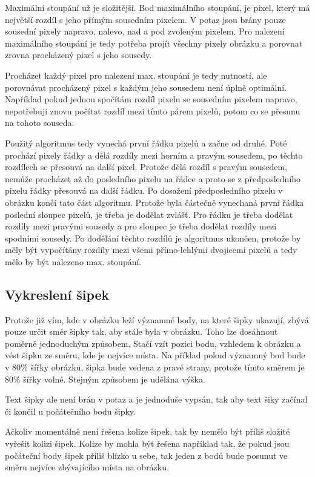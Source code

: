 \documentclass[12pt]{report}
\begin{document}
Maximální stoupání už je složitější. Bod maximálního stoupání, je pixel, který má největší rozdíl
s jeho přímým sousedním pixelem. V potaz jsou brány pouze sousední pixely napravo, nalevo, nad a pod
zvoleným pixelem. Pro nalezení maximálního stoupání je tedy potřeba projít všechny pixely obrázku 
a porovnat zrovna procházený pixel s jeho sousedy.

Procházet každý pixel pro nalezení max. stoupání je tedy nutností, ale porovnávat procházený pixel
s každým jeho sousedem není úplně optimální. Například pokud jednou spočítám rozdíl pixelu se 
sousedním pixelem napravo, nepotřebuji znovu počítat rozdíl mezi tímto párem pixelů, potom co se přesunu 
na tohoto souseda. 

Použitý algoritmus tedy vynechá první řádku pixelů a začne od druhé. Poté prochází pixely řádky a dělá
rozdíly mezi horním a pravým sousedem, po těchto rozdílech se přesouvá na další pixel. Protože dělá
rozdíl s pravým sousedem, nemůže procházet až do posledního pixelu na řádce a proto se z předposledního
pixelu řádky přesouvá na další řádku. Po dosažení předposledního pixelu v obrázku končí tato část algoritmu.
Protože byla částečně vynechaná první řádka poslední sloupec pixelů, je třeba je dodělat zvlášť. Pro
řádku je třeba dodělat rozdíly mezi pravými sousedy a pro sloupec je třeba dodělat rozdíly mezi spodními
sousedy. Po dodělání těchto rozdílů je algoritmus ukončen, protože by měly být vypočítány rozdíly mezi
všemi přímo-lehlými dvojicemi pixelů a tedy mělo by být nalezeno max. stoupání.
\subsection{Vykreslení šipek}
Protože již vím, kde v obrázku leží významné body, na které šipky ukazují, zbývá pouze určit směr šipky tak,
aby stále byla v obrázku. Toho lze dosáhnout poměrně jednoduchým způsobem. Stačí vzít pozici bodu, vzhledem
k obrázku a vést šipku ze směru, kde je nejvíce místa. Na příklad pokud významný bod bude v 80\% šířky obrázku,
šipka bude vedena z pravé strany, protože tímto směrem je 80\% šířky volné. Stejným způsobem je udělána výška.

Text šipky ale není brán v potaz a je jednoduše vypsán, tak aby text šiky začínal či končil u počátečního bodu šipky.

Ačkoliv momentálně není řešena kolize šipek, tak by nemělo být příliš složité vyřešit kolizi šipek. Kolize by mohla být
řešena například tak, že pokud jsou počáteční body šipek příliš blízko u sebe, tak jeden z bodů bude posunut ve směru
nejvíce zbývajícího místa na obrázku.
\end{document}
